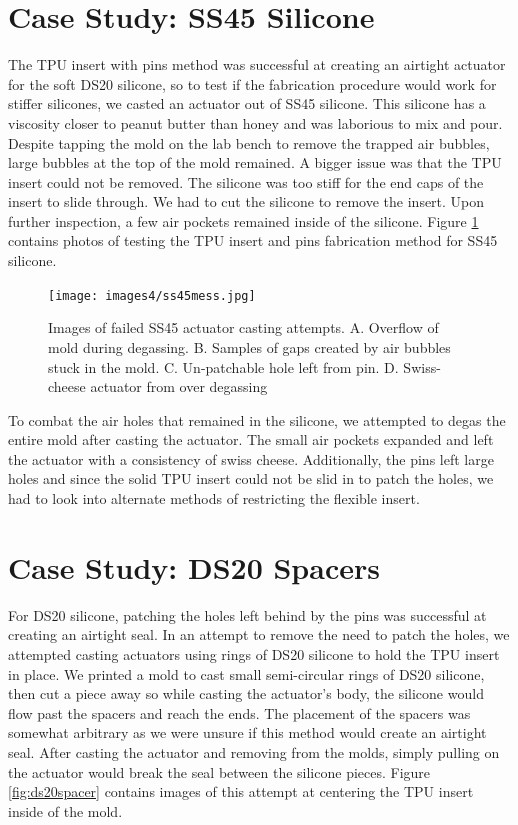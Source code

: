 \section{Case Study: SS45 Silicone}
The TPU insert with pins method was successful at creating an airtight actuator for the soft DS20 silicone, so to test if the fabrication procedure would work for stiffer silicones, we casted an actuator out of SS45 silicone. This silicone has a viscosity closer to peanut butter than honey and was laborious to mix and pour. Despite tapping the mold on the lab bench to remove the trapped air bubbles, large bubbles at the top of the mold remained. A bigger issue was that the TPU insert could not be removed. The silicone was too stiff for the end caps of the insert to slide through. We had to cut the silicone to remove the insert. Upon further inspection, a few air pockets remained inside of the silicone. Figure \ref{fig:ss45mess} contains photos of testing the TPU insert and pins fabrication method for SS45 silicone. 

\begin{figure}[h]
    \centering
    \texttt{[image: images4/ss45mess.jpg]}
    \caption{Images of failed SS45 actuator casting attempts. A. Overflow of mold during degassing. B. Samples of gaps created by air bubbles stuck in the mold. C. Un-patchable hole left from pin. D. Swiss-cheese actuator from over degassing}
    \label{fig:ss45mess}
\end{figure}

To combat the air holes that remained in the silicone, we attempted to degas the entire mold after casting the actuator. The small air pockets expanded and left the actuator with a consistency of swiss cheese. Additionally, the pins left large holes and since the solid TPU insert could not be slid in to patch the holes, we had to look into alternate methods of restricting the flexible insert. 

\section{Case Study: DS20 Spacers}
For DS20 silicone, patching the holes left behind by the pins was successful at creating an airtight seal. In an attempt to remove the need to patch the holes, we attempted casting actuators using rings of DS20 silicone to hold the TPU insert in place. We printed a mold to cast small semi-circular rings of DS20 silicone, then cut a piece away so while casting the actuator's body, the silicone would flow past the spacers and reach the ends. The placement of the spacers was somewhat arbitrary as we were unsure if this method would create an airtight seal. After casting the actuator and removing from the molds, simply pulling on the actuator would break the seal between the silicone pieces. Figure \ref{fig:ds20spacer} contains images of this attempt at centering the TPU insert inside of the mold. 

